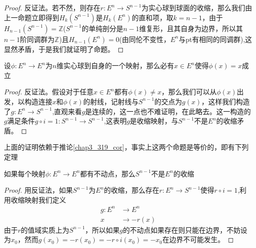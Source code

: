 \begin{proof}
反证法。若不然，则存在$r:E^{n}\rightarrow S^{n-1}$为实心球到球面的收缩，那么我们由上一命题立即得到$H_{k}(S^{n-1})$是$H_{k}(E^{n})$的直和项，取$k=n-1$，由于$H_{n-1}(S^{n-1})=\mathbb{Z}$($S^{n-1}$的单纯剖分是$n-1$维复形，且其自身为边界，所以其$n-1$阶同调群为$\mathbb{Z}$)且$H_{n-1}(E^{n})=0$(由同伦不变性，$E^{n}$与pt有相同的同调群),这显然矛盾，于是我们就证明了命题。
\end{proof}
\begin{theorem}[Brouwer不动点定理]
设$\phi:E^{n}\rightarrow E^{n}$为$n$维实心球到自身的一个映射，那么必有$x\in E^{n}$使得$\phi(x)=x$成立
\end{theorem}
\begin{proof}
反证法。假设对于任意$x\in E^{n}$都有$\phi(x)\neq x$，那么我们可以从$\phi(x)$出发，以构造连接$x$和$\phi(x)$的射线，记射线与$S^{n-1}$的交点为$g(x)$，这样我们构造了$g:E^{n}\rightarrow S^{n-1}$,直观来看$g$是连续的，这一点也不难证明，在此略去。这一构造的$g$满足条件$g\circ i=1:S^{n-1}\rightarrow S^{n-1}$,这表明$g$是收缩映射，与$S^{n-1}$不是$E^{n}$的收缩矛盾。
\end{proof}

上面的证明依赖于推论\eqref{chap3_319_cor}，事实上这两个命题是等价的，即有下列定理
\begin{proposition}
如果每个映射$\phi:E^{n}\rightarrow E^{n}$都有不动点，那么$S^{n-1}$不是$E^{n}$的收缩
\end{proposition}
\begin{proof}
用反证法，如果$S^{n-1}$为$E^{n}$的收缩，那么存在$r:E^{n}\rightarrow S^{n-1}$使得$r\circ i=1$,利用收缩映射我们定义
\begin{equation*}
    \begin{aligned}
    g:E^{n}&\rightarrow E^{n}\\
    x&\rightarrow-r(x)
    \end{aligned}
\end{equation*}
由于$r$的值域实质上为$S^{n-1}$，所以如果$g$的不动点如果存在则只能在边界，不妨设为$x_{0}$，然而$g(x_{0})=-r(x_{0})=-r\circ i(x_{0})=-x_{0}$在边界不可能发生。
\end{proof}

